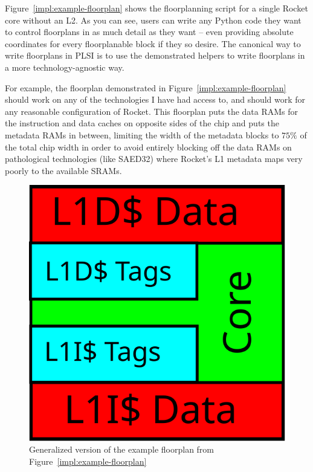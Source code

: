 \documentclass{article}
\begin{document}
Figure~\ref{impl:example-floorplan} shows the floorplanning script for a single
Rocket core without an L2.  As you can see, users can write any Python code
they want to control floorplans in as much detail as they want -- even
providing absolute coordinates for every floorplanable block if they so desire.
The canonical way to write floorplans in PLSI is to use the demonstrated
helpers to write floorplans in a more technology-agnostic way.

For example, the floorplan demonstrated in Figure~\ref{impl:example-floorplan}
should work on any of the technologies I have had access to, and should work
for any reasonable configuration of Rocket.  This floorplan puts the data RAMs
for the instruction and data caches on opposite sides of the chip and puts the
metadata RAMs in between, limiting the width of the metadata blocks to $75\%$
of the total chip width in order to avoid entirely blocking off the data RAMs
on pathological technologies (like SAED32) where Rocket's L1 metadata maps very
poorly to the available SRAMs.

\begin{figure}
  \begin{center}
    \includegraphics[width=0.95\linewidth]{figures/rocket-floorplan-general.svg}
  \end{center}
  \caption{Generalized version of the example floorplan from Figure~\ref{impl:example-floorplan}}
  \label{impl:example-floorplan-output}
\end{figure}
\end{document}
